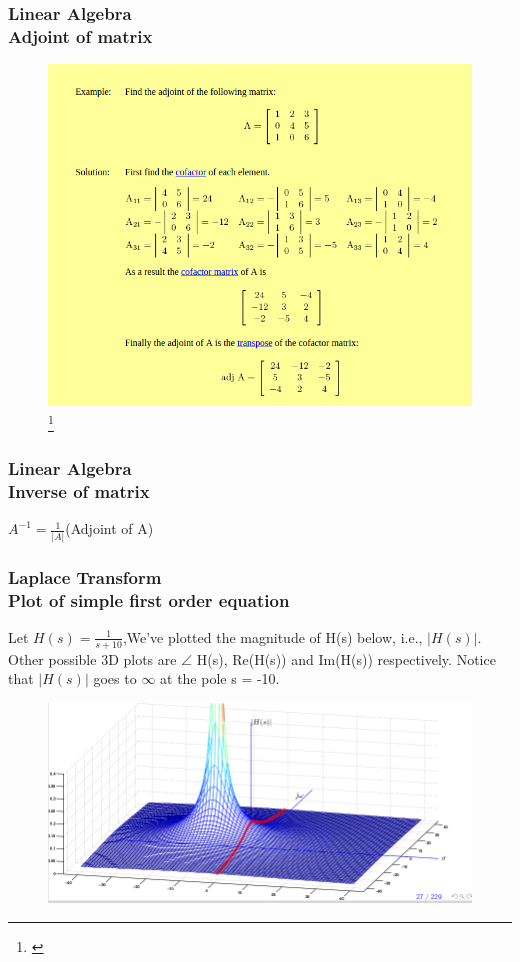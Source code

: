 \documentclass[hyperref={pdfpagelabels=true}]{beamer}
\newcounter{angle}
\begin{document}
\begin{frame}
\frametitle{Linear Algebra \\ {\large Adjoint of matrix}}
\begin{figure}[!tbp]
\centering
\includegraphics[scale = 0.35]{figs/Selection_013.png}
\footnote{\href{http://www.mathwords.com/a/adjoint.htm}{}}
\end{figure}
\end{frame}

\begin{frame}
\frametitle{Linear Algebra \\ {\large Inverse of matrix}}
\begin{center}
$A^{-1}=\frac{1}{|A|}$(Adjoint of A)
\end{center}
\end{frame}

\begin{frame}
\frametitle{Laplace Transform \\ {\large Plot of simple first order equation}} 
Let $H(s) = \frac{1}{s+10}$,We've plotted the magnitude of H(s) below, i.e., $\vert H(s) \vert$. Other
possible 3D plots are $\angle$ H(s), Re(H(s)) and Im(H(s)) respectively. Notice that $|H(s)|$ goes to $\infty$
at the pole s = -10.
\begin{figure}[!tbp]
\centering
\includegraphics[scale = 0.4]{figs/Selection_016.png}
\end{figure}
\end{frame}
\end{document}
